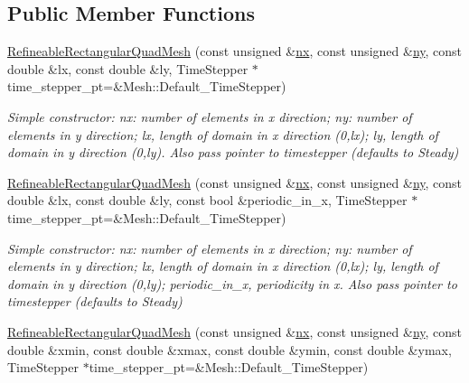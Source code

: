 \subsection*{Public Member Functions}
\begin{DoxyCompactItemize}
\item 
\hyperlink{classoomph_1_1RefineableRectangularQuadMesh_ac00e380a8fa1bdfc63fd25fdf9b5fbf0}{Refineable\+Rectangular\+Quad\+Mesh} (const unsigned \&\hyperlink{classoomph_1_1RectangularQuadMesh_abfef93d6322886cdce14a437186e4821}{nx}, const unsigned \&\hyperlink{classoomph_1_1RectangularQuadMesh_a86d76a55eb7c4e8bca9b74d23c8b0412}{ny}, const double \&lx, const double \&ly, Time\+Stepper $\ast$time\+\_\+stepper\+\_\+pt=\&Mesh\+::\+Default\+\_\+\+Time\+Stepper)
\begin{DoxyCompactList}\small\item\em Simple constructor\+: nx\+: number of elements in x direction; ny\+: number of elements in y direction; lx, length of domain in x direction (0,lx); ly, length of domain in y direction (0,ly). Also pass pointer to timestepper (defaults to Steady) \end{DoxyCompactList}\item 
\hyperlink{classoomph_1_1RefineableRectangularQuadMesh_aa49c7a67bd80678dd088430d7fc0bfc9}{Refineable\+Rectangular\+Quad\+Mesh} (const unsigned \&\hyperlink{classoomph_1_1RectangularQuadMesh_abfef93d6322886cdce14a437186e4821}{nx}, const unsigned \&\hyperlink{classoomph_1_1RectangularQuadMesh_a86d76a55eb7c4e8bca9b74d23c8b0412}{ny}, const double \&lx, const double \&ly, const bool \&periodic\+\_\+in\+\_\+x, Time\+Stepper $\ast$time\+\_\+stepper\+\_\+pt=\&Mesh\+::\+Default\+\_\+\+Time\+Stepper)
\begin{DoxyCompactList}\small\item\em Simple constructor\+: nx\+: number of elements in x direction; ny\+: number of elements in y direction; lx, length of domain in x direction (0,lx); ly, length of domain in y direction (0,ly); periodic\+\_\+in\+\_\+x, periodicity in x. Also pass pointer to timestepper (defaults to Steady) \end{DoxyCompactList}\item 
\hyperlink{classoomph_1_1RefineableRectangularQuadMesh_ad4e8f11be4917fe7eeb9de2213a98f7b}{Refineable\+Rectangular\+Quad\+Mesh} (const unsigned \&\hyperlink{classoomph_1_1RectangularQuadMesh_abfef93d6322886cdce14a437186e4821}{nx}, const unsigned \&\hyperlink{classoomph_1_1RectangularQuadMesh_a86d76a55eb7c4e8bca9b74d23c8b0412}{ny}, const double \&xmin, const double \&xmax, const double \&ymin, const double \&ymax, Time\+Stepper $\ast$time\+\_\+stepper\+\_\+pt=\&Mesh\+::\+Default\+\_\+\+Time\+Stepper)

\end{DoxyCompactItemize}
